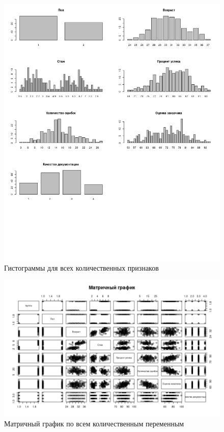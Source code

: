 \begin{figure}[H]
	\centering
	\includegraphics[width=\linewidth]{fighist}
	\caption{Гистограммы для всех количественных признаков}
\end{figure}

\begin{figure}[H]
	\centering
	\includegraphics[width=\linewidth]{fig1}
	\caption{Матричный график по всем количественным переменным}
\end{figure}

